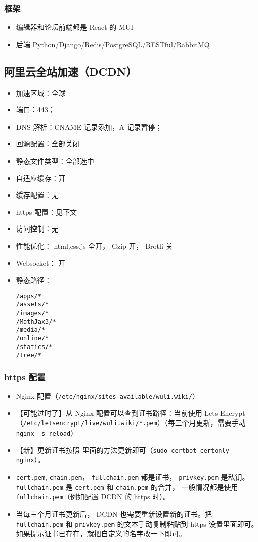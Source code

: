 \subsubsection{框架}
\begin{itemize}
\item 编辑器和论坛前端都是 React 的 MUI
\item 后端 Python/Django/Redis/PostgreSQL/RESTful/RabbitMQ
\end{itemize}

\subsection{阿里云全站加速（DCDN）}
\begin{itemize}
\item 加速区域：全球
\item 端口：443；
\item DNS 解析：CNAME 记录添加，A 记录暂停；
\item 回源配置：全部关闭
\item 静态文件类型：全部选中
\item 自适应缓存：开
\item 缓存配置：无
\item https 配置：见下文
\item 访问控制：无
\item 性能优化： html,css,js 全开， Gzip 开， Brotli 关
\item Websocket： 开
\item 静态路径：
\begin{lstlisting}[language=none]
/apps/*
/assets/*
/images/*
/MathJax3/*
/media/*
/online/*
/statics/*
/tree/*
\end{lstlisting}
\end{itemize}

\subsubsection{https 配置}
\begin{itemize}
\item Nginx 配置（\verb`/etc/nginx/sites-available/wuli.wiki/`）
\item 【可能过时了】从 Nginx 配置可以查到证书路径：当前使用 Lets Encrypt （\verb`/etc/letsencrypt/live/wuli.wiki/*.pem`）（每三个月更新，需要手动 \verb`nginx -s reload`）
\item 【新】更新证书按照 里面的方法更新即可（\verb`sudo certbot certonly --nginx`）。
\item \verb`cert.pem`, \verb`chain.pem`， \verb`fullchain.pem` 都是证书， \verb`privkey.pem` 是私钥。 \verb`fullchain.pem` 是 \verb`cert.pem` 和 \verb`chain.pem` 的合并， 一般情况都是使用 \verb`fullchain.pem`（例如配置 DCDN 的 https 时）。
\item 当每三个月证书更新后， DCDN 也需要重新设置新的证书。把 \verb`fullchain.pem` 和 \verb`privkey.pem` 的文本手动复制粘贴到 https 设置里面即可。如果提示证书已存在，就把自定义的名字改一下即可。
\end{itemize}
